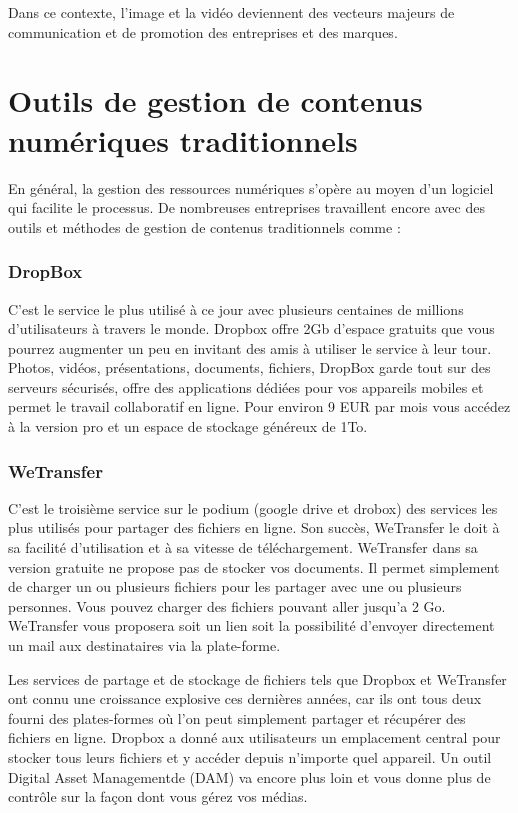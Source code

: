 Dans ce contexte, l’image et la vidéo deviennent des vecteurs majeurs de communication et de promotion des entreprises et des marques.

\newpage
\section{Outils de gestion de contenus numériques traditionnels}

En général, la gestion des ressources numériques s’opère au moyen d’un logiciel qui facilite le processus.
\newline
De nombreuses entreprises travaillent encore avec des outils et méthodes de gestion de contenus traditionnels comme :


\subsubsection{DropBox}{} 

C’est le service le plus utilisé à ce jour avec plusieurs centaines de millions d’utilisateurs à travers le monde. Dropbox offre 2Gb d’espace gratuits que vous pourrez augmenter un peu en invitant des amis à utiliser le service à leur tour. Photos, vidéos, présentations, documents, fichiers, DropBox garde tout sur des serveurs sécurisés, offre des applications dédiées pour vos appareils mobiles et permet le travail collaboratif en ligne. Pour environ 9 EUR par mois vous accédez à la version pro et un espace de stockage généreux de 1To.
\newline

\subsubsection{WeTransfer}{}

C’est le troisième service sur le podium (google drive et drobox) des services les plus utilisés pour partager des fichiers en ligne. Son succès, WeTransfer le doit à sa facilité d’utilisation et à sa vitesse de téléchargement. WeTransfer dans sa version gratuite ne propose pas de stocker vos documents. Il permet simplement de charger un ou plusieurs fichiers pour les partager avec une ou plusieurs personnes. Vous pouvez charger des fichiers pouvant aller jusqu’a 2 Go. WeTransfer vous proposera soit un lien soit la possibilité d’envoyer directement un mail aux destinataires via la plate-forme.
\newline

Les services de partage et de stockage de fichiers tels que Dropbox et WeTransfer ont connu une croissance explosive ces dernières années, car ils ont tous deux fourni des plates-formes où l'on peut simplement partager et récupérer des fichiers en ligne. Dropbox a donné aux utilisateurs un emplacement central pour stocker tous leurs fichiers et y accéder depuis n'importe quel appareil. Un outil  Digital Asset Managementde (DAM) va encore plus loin et vous donne plus de contrôle sur la façon dont vous gérez vos médias.

